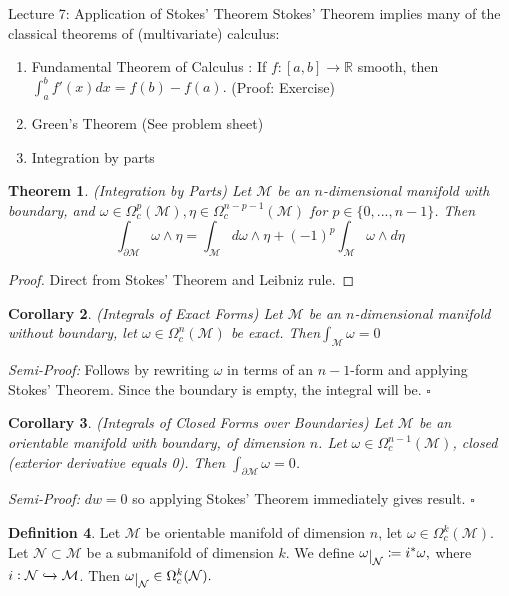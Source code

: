 \documentclass[10pt]{article}
\theoremstyle{plain}
\newtheorem{thm}{Theorem}[section] %
\newtheorem{corollary}[thm]{Corollary}
\theoremstyle{definition}
\newtheorem{defn}[thm]{Definition} %
\newenvironment{semiproof}{\textit{Semi-Proof:}}{\hfill$\square$}
\newcommand{\Real}{\mathbb{R}}
\newcommand{\man}{\mathcal{M}}
\newcommand{\nan}{\mathcal{N}}
\newcommand{\compactpformman}[1]{\Omega^{#1}_c(\man)}
\newcommand{\compactpformnan}[1]{\Omega^{#1}_c(\nan)}
\newcommand{\dx}{dx}
\newcommand{\deriv}{d}
\newcommand{\dw}{d\omega}
\def\restrict#1{\raise-.5ex\hbox{\ensuremath|}_{#1}}
\begin{document}
\begin{section}{Lecture 7: Application of Stokes' Theorem}
Stokes' Theorem implies many of the classical theorems of (multivariate) calculus:
\begin{enumerate}
    \item Fundamental Theorem of Calculus : If $f : [a,b] \to \Real$ smooth, then $\int_a^b f'(x) \dx = f(b) - f(a). $ (Proof: Exercise) 
    \item Green's Theorem (See problem sheet)
    \item Integration by parts
\end{enumerate}
\begin{thm} (Integration by Parts) Let $\man$ be an $n$-dimensional manifold with boundary, and $\omega \in \compactpformman{p}, \eta \in \compactpformman{n-p-1}$ for $p \in \{0,...,n-1\}$. Then
$$\int_{\partial \man} \omega \wedge \eta = \int_{\man} \dw \wedge \eta + (-1)^p \int_\man \omega \wedge \deriv \eta$$
\end{thm}
\begin{proof}
Direct from Stokes' Theorem and Leibniz rule.
\end{proof}
\begin{corollary}{(Integrals of Exact Forms)}
Let $\man$ be an $n$-dimensional manifold without boundary, let $\omega \in \compactpformman{n}$ be exact. Then$\int_\man \omega = 0$
\end{corollary}\noindent
\begin{semiproof}
Follows by rewriting $\omega $ in terms of an $n-1$-form and applying Stokes' Theorem. Since the boundary is empty, the integral will be.
\end{semiproof} 
\begin{corollary}{(Integrals of Closed Forms over Boundaries)} Let $\man$ be an orientable manifold with boundary, of dimension $n$. Let $\omega \in \compactpformman{n-1}$, closed (exterior derivative equals 0). Then $\int_{\partial\man}\omega = 0$.
\end{corollary}\noindent
\begin{semiproof}
$dw = 0 $ so applying Stokes' Theorem immediately gives result.
\end{semiproof}
\begin{defn}
Let $\man$ be orientable manifold of dimension $n$, let $\omega \in \compactpformman{k}$. Let $\nan \subset \man $ be a submanifold of dimension $k$. We define $\omega\restrict{\nan} \coloneqq i^* \omega,$ where $i:\nan\xhookrightarrow{}\man$. Then $\omega\restrict{\nan} \in \compactpformnan{k}.$
\end{defn}


\end{section}
\end{document}
